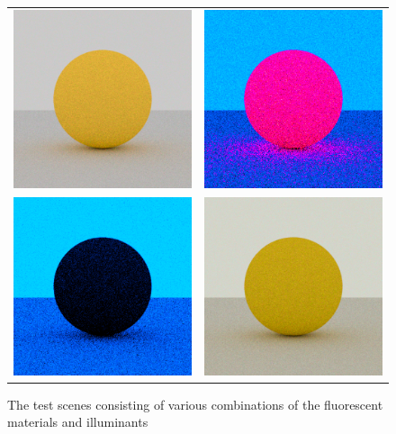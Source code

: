 \begin{figure}[h]
	\begin{tabular}{cc}
		\includegraphics[width=.45\linewidth]{img/fluorescent_sphere_D50_red.png}
		&
		\includegraphics[width=.45\linewidth]{img/fluorescent_sphere_mono_red.png} \\
		\includegraphics[width=.45\linewidth]{img/fluorescent_sphere_mono_invisible.png}
		&
		\includegraphics[width=.45\linewidth]{img/fluorescent_sphere_fluoD50_nonfluo.png}
	\end{tabular}
	\caption{The test scenes consisting of various combinations of the fluorescent materials and illuminants}
	\label{fig:fluorescence}
\end{figure}

